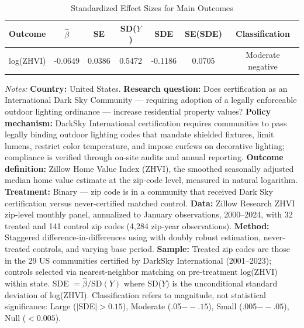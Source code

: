 
\begin{table}[H]
\centering
\caption{Standardized Effect Sizes for Main Outcomes}
\label{tab:sde}
\begin{threeparttable}
\begin{tabular}{lcccccc}
\toprule
Outcome & $\hat{\beta}$ & SE & SD($Y$) & SDE & SE(SDE) & Classification \\
\midrule
log(ZHVI) & -0.0649 & 0.0386 & 0.5472 & -0.1186 & 0.0705 & Moderate negative \\
\bottomrule
\end{tabular}
\begin{tablenotes}[flushleft]
\small
\item \textit{Notes:} \textbf{Country:} United States. \textbf{Research question:} Does certification as an International Dark Sky Community --- requiring adoption of a legally enforceable outdoor lighting ordinance --- increase residential property values? \textbf{Policy mechanism:} DarkSky International certification requires communities to pass legally binding outdoor lighting codes that mandate shielded fixtures, limit lumens, restrict color temperature, and impose curfews on decorative lighting; compliance is verified through on-site audits and annual reporting. \textbf{Outcome definition:} Zillow Home Value Index (ZHVI), the smoothed seasonally adjusted median home value estimate at the zip-code level, measured in natural logarithm. \textbf{Treatment:} Binary --- zip code is in a community that received Dark Sky certification versus never-certified matched control. \textbf{Data:} Zillow Research ZHVI zip-level monthly panel, annualized to January observations, 2000--2024, with 32 treated and 141 control zip codes (4,284 zip-year observations). \textbf{Method:} Staggered difference-in-differences using \citet{callaway2021difference} with doubly robust estimation, never-treated controls, and varying base period. \textbf{Sample:} Treated zip codes are those in the 29 US communities certified by DarkSky International (2001--2023); controls selected via nearest-neighbor matching on pre-treatment log(ZHVI) within state. SDE $= \hat{\beta} / \text{SD}(Y)$ where SD($Y$) is the unconditional standard deviation of log(ZHVI). Classification refers to magnitude, not statistical significance: Large ($|$SDE$| > 0.15$), Moderate (.05$--.15$), Small (.005$--.05$), Null ($< 0.005$).
\end{tablenotes}
\end{threeparttable}
\end{table}
